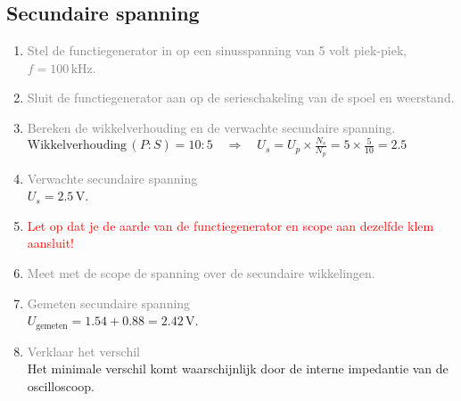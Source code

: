 \subsection{Secundaire spanning}
\begin{enumerate}
    \item \textcolor{gray}{Stel de functiegenerator in op een sinusspanning van 5 volt piek-piek, \( f = 100 \, \text{kHz} \).}
    \item \textcolor{gray}{Sluit de functiegenerator aan op de serieschakeling van de spoel en weerstand.}
    \item \textcolor{gray}{Bereken de wikkelverhouding en de verwachte secundaire spanning.}
    \\ \(\text{Wikkelverhouding} \, (P:S) = 10:5 \quad \Rightarrow \quad U_s = U_p \times \frac{N_s}{N_p} = 5 \times \frac{5}{10}=2.5\)
    \item \textcolor{gray}{Verwachte secundaire spanning}
    \\ \( U_s = 2.5 \, \text{V} \).
    \item \textcolor{red}{Let op dat je de aarde van de functiegenerator en scope aan dezelfde klem aansluit!}
    \item \textcolor{gray}{Meet met de scope de spanning over de secundaire wikkelingen.}
    \item \textcolor{gray}{Gemeten secundaire spanning}
    \\ \( U_{\text{gemeten}} = 1.54 + 0.88 = 2.42 \, \text{V} \).
    \item \textcolor{gray}{Verklaar het verschil}
    \\ Het minimale verschil komt waarschijnlijk door de interne impedantie van de oscilloscoop.
\end{enumerate}
